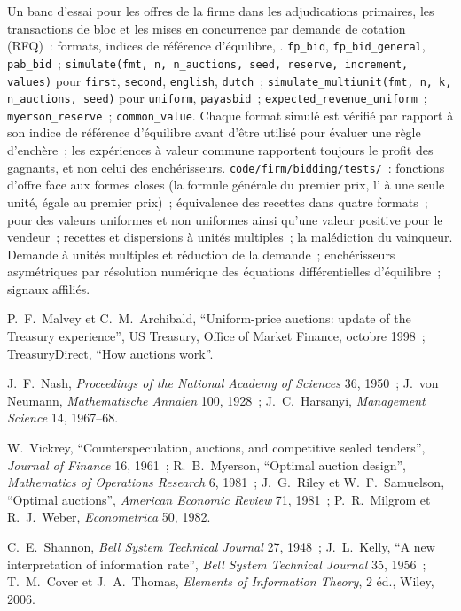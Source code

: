 \begin{build}
 Un banc d'essai pour les offres de la firme dans les adjudications primaires, les transactions de bloc et les mises en concurrence par demande de cotation (RFQ)~: formats, indices de référence d'équilibre, .
 \texttt{fp\_bid}, \texttt{fp\_bid\_general}, \texttt{pab\_bid}~; \texttt{simulate(fmt, n, n\_auctions, seed, reserve, increment, values)} pour \texttt{first}, \texttt{second},
\texttt{english}, \texttt{dutch}~; \texttt{simulate\_multiunit(fmt, n, k, n\_auctions, seed)} pour \texttt{uniform}, \texttt{payasbid}~; \texttt{expected\_revenue\_uniform}~; \texttt{myerson\_reserve}~; \texttt{common\_value}.
 Chaque format simulé est vérifié par rapport à son indice de référence d'équilibre avant d'être utilisé pour évaluer une règle d'enchère~; les expériences à valeur commune rapportent toujours le profit des gagnants, et non celui des enchérisseurs.
 \texttt{code/firm/bidding/tests/}~: fonctions d'offre face aux formes closes (la formule générale du premier prix, l' à une seule unité, égale au premier prix)~; équivalence des recettes dans quatre
formats~;  pour des valeurs uniformes et non uniformes ainsi qu'une valeur positive pour le vendeur~; recettes et dispersions à unités multiples~; la malédiction du vainqueur.
 Demande à unités multiples et réduction de la demande~; enchérisseurs asymétriques par résolution numérique des équations différentielles d'équilibre~; signaux affiliés.
\end{build}

\begin{omsources}
\item P.~F.~Malvey et C.~M.~Archibald, ``Uniform-price auctions: update of the Treasury experience'', US Treasury, Office of Market Finance, octobre 1998~; TreasuryDirect, ``How auctions work''.
\item J.~F.~Nash, \emph{Proceedings of the National Academy of Sciences} 36, 1950~; J.~von Neumann, \emph{Mathematische Annalen} 100, 1928~; J.~C.~Harsanyi, \emph{Management Science} 14, 1967--68.
\item W.~Vickrey, ``Counterspeculation, auctions, and competitive sealed tenders'', \emph{Journal of Finance} 16, 1961~; R.~B.~Myerson, ``Optimal auction design'', \emph{Mathematics of Operations Research} 6,
1981~; J.~G.~Riley et W.~F.~Samuelson, ``Optimal auctions'', \emph{American Economic Review} 71, 1981~; P.~R.~Milgrom et R.~J.~Weber, \emph{Econometrica} 50, 1982.
\item C.~E.~Shannon, \emph{Bell System Technical Journal} 27, 1948~; J.~L.~Kelly, ``A new interpretation of information rate'', \emph{Bell System Technical Journal} 35, 1956~; T.~M.~Cover et J.~A.~Thomas,
\emph{Elements of Information Theory}, 2 éd., Wiley, 2006.
\end{omsources}

